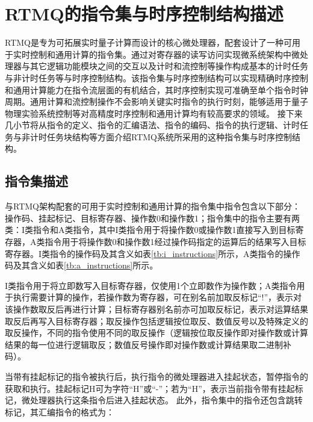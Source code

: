 \newpage
\section[RTMQ的指令集与时序控制结构描述]{RTMQ的指令集与时序控制结构描述}
RTMQ是专为可拓展实时量子计算而设计的核心微处理器，配套设计了一种可用于实时控制和通用计算的指令集\cite[]{junhua03}。通过对寄存器的读写访问实现微系统架构中微处理器与其它逻辑功能模块之间的交互以及计时和流控制等操作构成基本的计时任务与非计时任务等与时序控制结构。该指令集与时序控制结构可以实现精确时序控制和通用计算能力在指令流层面的有机结合，其时序控制实现可准确至单个指令时钟周期。通用计算和流控制操作不会影响关键实时指令的执行时刻，能够适用于量子物理实验系统控制等对高精度时序控制和通用计算均有较高要求的领域。
接下来几小节将从指令的定义、指令的汇编语法、指令的编码、指令的执行逻辑、计时任务与非计时任务块结构等方面介绍RTMQ系统所采用的这种指令集与时序控制结构。

\subsection[指令集描述]{指令集描述\label{section:rtmq_instruction_set}}

与RTMQ架构配套的可用于实时控制和通用计算的指令集中指令包含以下部分：操作码、挂起标记、目标寄存器、操作数0和操作数1；指令集中的指令主要有两类：I类指令和A类指令，其中I类指令用于将操作数0或操作数1直接写入到目标寄存器，A类指令用于将操作数0和操作数1经过操作码指定的运算后的结果写入目标寄存器。I类指令的操作码及其含义如表\ref{tb:i_instructions}所示，A类指令的操作码及其含义如表\ref{tb:a_instructions}所示。

I类指令用于将立即数写入目标寄存器，仅使用1个立即数作为操作数；A类指令用于执行需要计算的操作，若操作数为寄存器，可在别名前加取反标记“!”，表示对该操作数取反后再进行计算；目标寄存器别名前亦可加取反标记，表示对运算结果取反后再写入目标寄存器；取反操作包括逻辑按位取反、数值反号以及特殊定义的取反操作，不同的指令使用不同的取反操作（逻辑按位取反操作即对操作数或计算结果的每一位进行逻辑取反；数值反号操作即对操作数或计算结果取二进制补码）。

当带有挂起标记的指令被执行后，执行指令的微处理器进入挂起状态，暂停指令的获取和执行。挂起标记H可为字符“H”或“-”；若为“H”，表示当前指令带有挂起标记，微处理器执行这条指令后进入挂起状态。
此外，指令集中的指令还包含跳转标记，其汇编指令的格式为：

